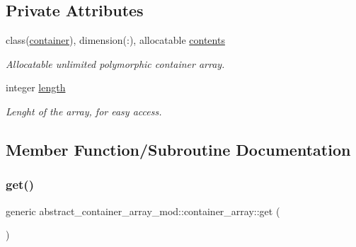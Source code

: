 \subsection*{Private Attributes}
\begin{DoxyCompactItemize}
\item 
class(\hyperlink{structcontainer__mod_1_1container}{container}), dimension(\+:), allocatable \hyperlink{structabstract__container__array__mod_1_1container__array_a506bf56ce508f7041b765c7d19959902}{contents}
\begin{DoxyCompactList}\small\item\em Allocatable unlimited polymorphic container array. \end{DoxyCompactList}\item 
integer \hyperlink{structabstract__container__array__mod_1_1container__array_a0ec81671d521b7a118a83e79f1d40b56}{length}
\begin{DoxyCompactList}\small\item\em Lenght of the array, for easy access. \end{DoxyCompactList}\end{DoxyCompactItemize}


\subsection{Member Function/\+Subroutine Documentation}
\mbox{\label{structabstract__container__array__mod_1_1container__array_a3dfae16ca3f2afa43766e4241f73dd1b}} 
\subsubsection{\texorpdfstring{get()}{get()}}
{\footnotesize\ttfamily generic abstract\+\_\+container\+\_\+array\+\_\+mod\+::container\+\_\+array\+::get (\begin{DoxyParamCaption}{ }\end{DoxyParamCaption})\hspace{0.3cm}{\ttfamily [private]}}

\mbox{\label{structabstract__container__array__mod_1_1container__array_ab91570b2196a2f5aafb0aa51a114b451}} 
